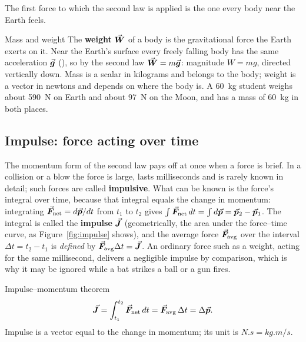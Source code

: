The first force to which the second law is applied is the one every body near the Earth feels.

\begin{defbox}{Mass and weight}
The \textbf{weight} $\vec{\bm{W}}$ of a body is the gravitational force the Earth exerts on it. Near the
Earth's surface every freely falling body has the same acceleration $\vec{\bm{g}}$ (),
so by the second law $\vec{\bm{W}}=m\vec{\bm{g}}$: magnitude $W=mg$, directed vertically down. Mass is a scalar in
kilograms and belongs to the body; weight is a vector in newtons and depends on where the body is. A
\SI{60}{kg} student weighs about \SI{590}{N} on Earth and about \SI{97}{N} on the Moon, and has a mass
of \SI{60}{kg} in both places.
\end{defbox}

\subsection{Impulse: force acting over time}

The momentum form of the second law pays off at once when a force is brief. In a collision or a blow
the force is large, lasts milliseconds and is rarely known in detail; such forces are called
\textbf{impulsive}. What can be known is the force's integral over time, because that integral equals
the change in momentum: integrating $\vec{\bm{F}}_{\text{net}}=d\vec{\bm{p}}/dt$ from $t_1$ to $t_2$ gives
$\int\vec{\bm{F}}_{\text{net}}\,dt=\int d\vec{\bm{p}}=\vec{\bm{p}}_2-\vec{\bm{p}}_1$. The integral is called the \textbf{impulse} $\vec{\bm{J}}$ (geometrically, the area under the force--time
curve, as Figure~\ref{fig:impulse} shows),
and the average force $\vec{\bm{F}}_{\text{avg}}$ over the interval $\Delta t=t_2-t_1$ is \emph{defined} by
$\vec{\bm{F}}_{\text{avg}}\Delta t=\vec{\bm{J}}$. An ordinary force such as a weight, acting for
the same millisecond, delivers a negligible impulse by comparison, which is why it may be ignored while a
bat strikes a ball or a gun fires.

\begin{keybox}{Impulse--momentum theorem}
\[
\vec{\bm{J}}=\int_{t_1}^{t_2}\vec{\bm{F}}_{\text{net}}\,dt=\vec{\bm{F}}_{\text{avg}}\,\Delta t=\Delta\vec{\bm{p}}.
\]
Impulse is a vector equal to the change in momentum; its unit is $\si{N.s}=\si{kg.m/s}$.
\end{keybox}

\begin{figure}[htbp]
\centering
{}
\end{figure}

